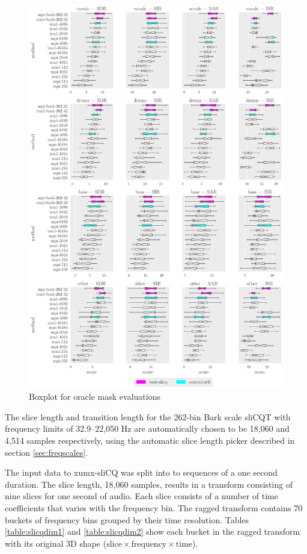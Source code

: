 \documentclass[report.tex]{subfiles}
\begin{document}
\begin{figure}[ht]
	\centering
	\includegraphics[width=\textwidth]{./images-bss/oracle_boxplot.pdf}
	\caption{Boxplot for oracle mask evaluations}
	\label{fig:oraclebssboxplot}
\end{figure}

The slice length and transition length for the 262-bin Bark scale sliCQT with frequency limits of 32.9--22,050 Hz are automatically chosen to be 18,060 and 4,514 samples respectively, using the automatic slice length picker described in section \ref{sec:freqscales}.

The input data to xumx-sliCQ was split into to sequences of a one second duration. The slice length, 18,060 samples, results in a transform consisting of nine slices for one second of audio. Each slice consists of a number of time coefficients that varies with the frequency bin. The ragged transform contains 70 buckets of frequency bins grouped by their time resolution. Tables \ref{table:slicqdim1} and \ref{table:slicqdim2} show each bucket in the ragged transform with its original 3D shape ($\text{slice} \times \text{frequency} \times \text{time}$).
\end{document}

